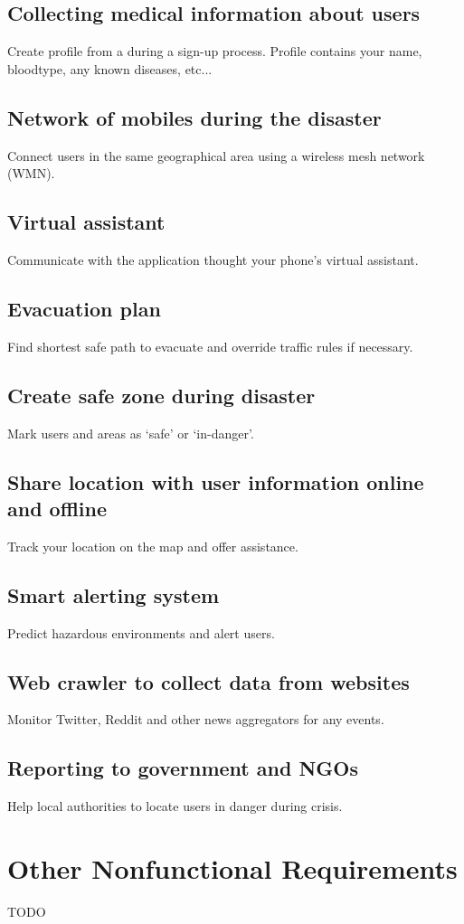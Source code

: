 \documentclass{scrreprt}
\begin{document}
\section{Collecting medical information about users}
Create profile from a during a sign-up process. Profile contains your name, bloodtype, any known diseases, etc...
\section{Network of mobiles during the disaster}
Connect users in the same geographical area using a wireless mesh network (WMN).
\section{Virtual assistant}
Communicate with the application thought your phone's virtual assistant.
\section{Evacuation plan}
Find shortest safe path to evacuate and override traffic rules if necessary. 
\section{Create safe zone during disaster}
Mark users and areas as `safe' or `in-danger'.
\section{Share location with user information online and offline}
Track your location on the map and offer assistance.
\section{Smart alerting system}
Predict hazardous environments and alert users.
\section{Web crawler to collect data from websites}
Monitor Twitter, Reddit and other news aggregators for any events.
\section{Reporting to government and NGOs}
Help local authorities to locate users in danger during crisis.

\chapter{Other Nonfunctional Requirements}
TODO
\end{document}
